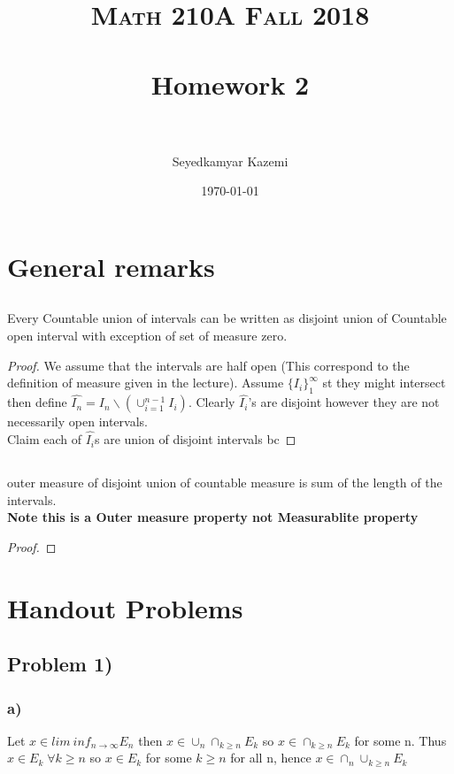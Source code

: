 \documentclass[paper=letter, fontsize=11pt]{scrartcl} %
\title{	
\normalfont \normalsize 
\textsc{Math 210A Fall 2018} \\ [25pt] %
\horrule{0.5pt} \\[0.4cm] %
\huge Homework 2\\ %
\horrule{2pt} \\[0.5cm] %
}
\author{Seyedkamyar Kazemi} %
\date{\normalsize\today} %
\newcommand{\set}[1]{\{#1\}}
\begin{document}
\maketitle
\section{General remarks}
\subsection{}
\begin{tcolorbox}
Every Countable union of intervals can be written as disjoint union of Countable open interval with exception of set of measure zero.
\begin{proof}
We assume that the intervals are half open (This correspond to the definition of measure given in the lecture). 
Assume $\set{I_i}_1^\infty$ st they might intersect then define $\hat{I_n}=I_n\backslash(\cup_{i=1} ^{n-1} I_i)$. Clearly $\hat{I_i}$'s are disjoint however they are not necessarily open intervals.  \\
Claim each of $\hat{I_i}$s are union of disjoint intervals bc

\end{proof}
\end{tcolorbox}
\subsection{}

\begin{tcolorbox}
outer measure of disjoint union of countable measure is sum of the length of the intervals.\\
\textbf{Note this is a Outer measure property not Measurablite property}
\begin{proof}

\end{proof}
\end{tcolorbox}
    \section{Handout Problems}
    \subsection*{Problem 1)}
    \subsubsection*{a)}
    \newcommand{\lmnf}[1]{lim\:inf_{n \rightarrow \infty} #1}
    \newcommand{\lmsp}[1]{lim\:su;_{n \rightarrow \infty} #1}
    Let $x \in  \lmnf{E_n}$ then $x \in \cup_n\cap_{k\geq n} E_k$ so $x \in \cap_{k\geq n} E_k$ for some n. Thus $x \in E_k \; \forall k \geq n$  so $x \in E_k$ for some $k  \geq n$ for all n, hence $x \in \cap_n\cup_{k\geq n} E_k$
\end{document}
